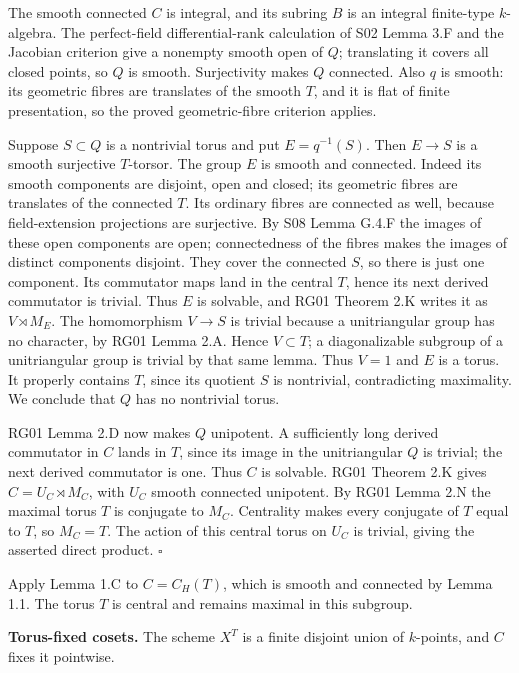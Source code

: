 \documentclass[11pt,a4paper,openany]{report}
\newcounter{none}
\begin{document}
The smooth connected \(C\) is integral, and its subring \(B\) is an integral finite-type \(k\)-algebra. The perfect-field differential-rank calculation of S02 Lemma 3.F and the Jacobian criterion give a nonempty smooth open of \(Q\); translating it covers all closed points, so \(Q\) is smooth. Surjectivity makes \(Q\) connected. Also \(q\) is smooth: its geometric fibres are translates of the smooth \(T\), and it is flat of finite presentation, so the proved geometric-fibre criterion applies.

Suppose \(S\subset Q\) is a nontrivial torus and put \(E=q^{-1}(S)\). Then \(E\to S\) is a smooth surjective \(T\)-torsor. The group \(E\) is smooth and connected. Indeed its smooth components are disjoint, open and closed; its geometric fibres are translates of the connected \(T\). Its ordinary fibres are connected as well, because field-extension projections are surjective. By S08 Lemma G.4.F the images of these open components are open; connectedness of the fibres makes the images of distinct components disjoint. They cover the connected \(S\), so there is just one component. Its commutator maps land in the central \(T\), hence its next derived commutator is trivial. Thus \(E\) is solvable, and RG01 Theorem 2.K writes it as \(V\rtimes M_E\). The homomorphism \(V\to S\) is trivial because a unitriangular group has no character, by RG01 Lemma 2.A. Hence \(V\subset T\); a diagonalizable subgroup of a unitriangular group is trivial by that same lemma. Thus \(V=1\) and \(E\) is a torus. It properly contains \(T\), since its quotient \(S\) is nontrivial, contradicting maximality. We conclude that \(Q\) has no nontrivial torus.

RG01 Lemma 2.D now makes \(Q\) unipotent. A sufficiently long derived commutator in \(C\) lands in \(T\), since its image in the unitriangular \(Q\) is trivial; the next derived commutator is one. Thus \(C\) is solvable. RG01 Theorem 2.K gives \(C=U_C\rtimes M_C\), with \(U_C\) smooth connected unipotent. By RG01 Lemma 2.N the maximal torus \(T\) is conjugate to \(M_C\). Centrality makes every conjugate of \(T\) equal to \(T\), so \(M_C=T\). The action of this central torus on \(U_C\) is trivial, giving the asserted direct product. \(\square\)

Apply Lemma 1.C to \(C=C_H(T)\), which is smooth and connected by Lemma 1.1. The torus \(T\) is central and remains maximal in this subgroup.

\textbf{Torus-fixed cosets.} The scheme \(X^T\) is a finite disjoint union of \(k\)-points, and \(C\) fixes it pointwise.
\end{document}
